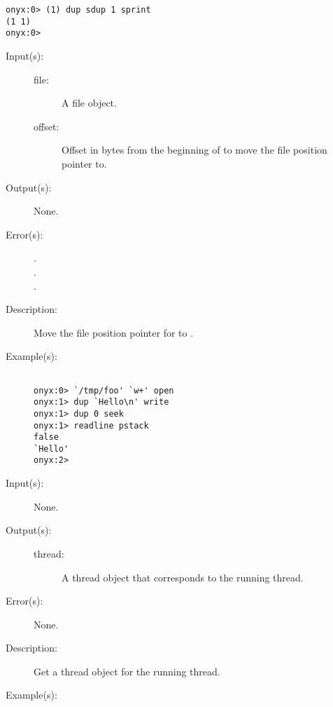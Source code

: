 \begin{description}
\begin{description}
\begin{verbatim}
onyx:0> (1) dup sdup 1 sprint
(1 1)
onyx:0>
		\end{verbatim}
	\end{description}
\label{systemdict:seek}
\item[{\onyxop{file offset}{seek}{--}}: ]
	\begin{description}\item[]
	\item[Input(s): ]
		\begin{description}\item[]
		\item[file: ]
			A file object.
		\item[offset: ]
			Offset in bytes from the beginning of 
			to move the file position pointer to.
		\end{description}
	\item[Output(s): ] None.
	\item[Error(s): ]
		\begin{description}\item[]
		\item[.]
		\item[.]
		\item[.]
		\end{description}
	\item[Description: ]
		Move the file position pointer for  to
		.
	\item[Example(s): ]\begin{verbatim}

onyx:0> `/tmp/foo' `w+' open
onyx:1> dup `Hello\n' write
onyx:1> dup 0 seek
onyx:1> readline pstack
false
`Hello'
onyx:2>
		\end{verbatim}
	\end{description}
\label{systemdict:self}
\item[{\onyxop{--}{self}{thread}}: ]
	\begin{description}\item[]
	\item[Input(s): ] None.
	\item[Output(s): ]
		\begin{description}\item[]
		\item[thread: ]
			A thread object that corresponds to the running thread.
		\end{description}
	\item[Error(s): ] None.
	\item[Description: ]
		Get a thread object for the running thread.
	\item[Example(s): ]\begin{verbatim}


\end{verbatim}
\end{description}
\end{description}
